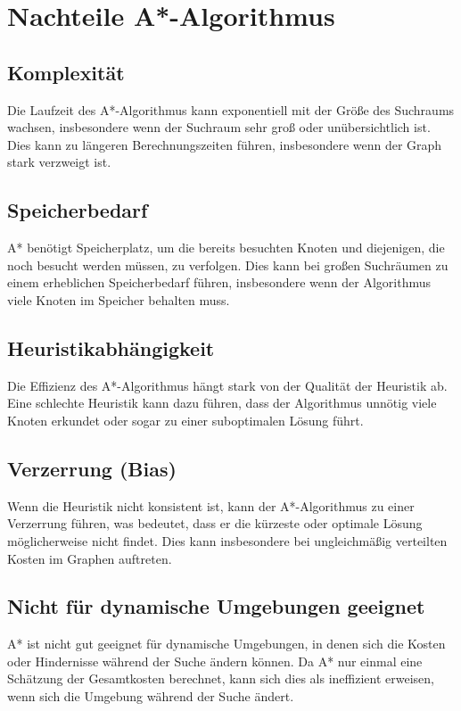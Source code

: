 \chapter{Nachteile A*-Algorithmus}

\section{Komplexität}
Die Laufzeit des A*-Algorithmus kann exponentiell mit der Größe des Suchraums wachsen, insbesondere wenn der Suchraum sehr groß oder unübersichtlich ist. Dies kann zu längeren Berechnungszeiten führen, insbesondere wenn der Graph stark verzweigt ist.

\section{Speicherbedarf}
A* benötigt Speicherplatz, um die bereits besuchten Knoten und diejenigen, die noch besucht werden müssen, zu verfolgen. Dies kann bei großen Suchräumen zu einem erheblichen Speicherbedarf führen, insbesondere wenn der Algorithmus viele Knoten im Speicher behalten muss.

\section{Heuristikabhängigkeit}
Die Effizienz des A*-Algorithmus hängt stark von der Qualität der Heuristik ab. Eine schlechte Heuristik kann dazu führen, dass der Algorithmus unnötig viele Knoten erkundet oder sogar zu einer suboptimalen Lösung führt.

 
 \section{Verzerrung (Bias)}
 Wenn die Heuristik nicht konsistent ist, kann der A*-Algorithmus zu einer Verzerrung führen, was bedeutet, dass er die kürzeste oder optimale Lösung möglicherweise nicht findet. Dies kann insbesondere bei ungleichmäßig verteilten Kosten im Graphen auftreten.

\section{Nicht für dynamische Umgebungen geeignet} A* ist nicht gut geeignet für dynamische Umgebungen, in denen sich die Kosten oder Hindernisse während der Suche ändern können. Da A* nur einmal eine Schätzung der Gesamtkosten berechnet, kann sich dies als ineffizient erweisen, wenn sich die Umgebung während der Suche ändert.
